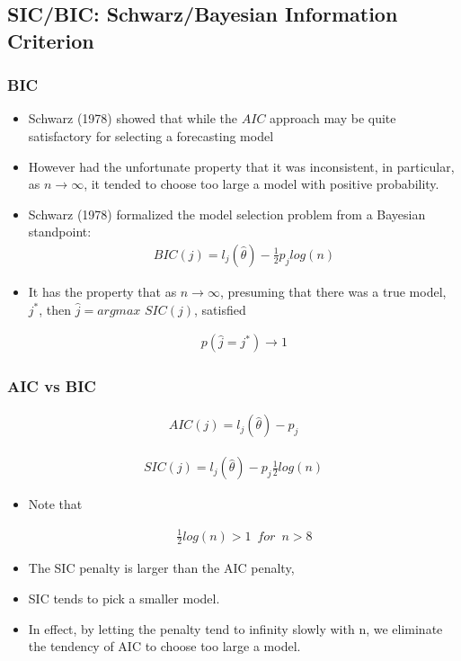 \documentclass[
  shownotes,
  xcolor={svgnames},
  hyperref={colorlinks,citecolor=DarkBlue,linkcolor=DarkRed,urlcolor=DarkBlue}
  , aspectratio=169]{beamer}
\begin{document}
\subsection{SIC/BIC: Schwarz/Bayesian Information Criterion}
\begin{frame}[fragile]
\frametitle{BIC}
\begin{itemize}
\item Schwarz (1978) showed that while the $AIC$ approach may be quite satisfactory for selecting a forecasting model 
\item However had the unfortunate property that it was inconsistent, in particular, as $n \rightarrow \infty$, it tended to choose too large a model with positive probability. 

\item Schwarz (1978) formalized the model selection problem from a Bayesian standpoint: 
\begin{align}
BIC(j) = l_j(\hat \theta) -\frac{1}{2} p_j log(n)
\end{align}

\item It has the property that as $n\rightarrow \infty$, presuming that there was a true model, $j^*$, then $\hat j =argmax\,\, SIC(j)$, satisfied

\begin{align}
p(\hat j = j^*) \rightarrow 1
\end{align}
\end{itemize}
\end{frame}
\begin{frame}[fragile]
\frametitle{AIC vs BIC}

\begin{align}
AIC(j) = l_j(\hat \theta) - p_j
\end{align}


\begin{align}
SIC(j) = l_j(\hat \theta) -  p_j \frac{1}{2} log(n)
\end{align}

\begin{itemize}
\item Note that  

\begin{align}
\frac{1}{2} log(n) > 1 \,\,\, for \,\,\, n > 8
\end{align}

 \item The SIC penalty is larger than the AIC penalty, 
 \item SIC tends to pick a smaller model. 
 \item In effect, by letting the penalty tend to infinity slowly with n, we eliminate the tendency of AIC to choose too large a model.

\end{itemize}
\end{frame}
\end{document}
